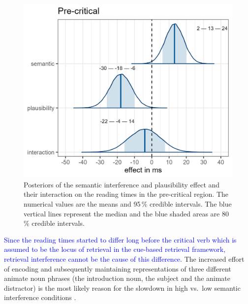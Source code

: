 \documentclass[review,preprint,12pt,authoryear,floatsintext]{elsarticle}
\begin{document}
\begin{figure}[ht]
    \centering
        \caption{Posteriors of the semantic interference and plausibility effect and their interaction on the reading times in the pre-critical region. The numerical values are the means and 95\,\% credible intervals. The blue vertical lines represent the median and the blue shaded areas are 80\,\% credible intervals.}\label{fig:posteriors_plausibility}
    \includegraphics[width=0.8\linewidth]{posteriors_spr_pooled_774_plausibility.png}
\end{figure}

\textcolor{blue}{Since the reading times started to differ long before the critical verb which is assumed to be the locus of retrieval in the cue-based retrieval framework,  retrieval interference cannot be the cause of this difference.} \label{smith2} The increased effort of encoding and subsequently maintaining representations of three different animate noun phrases (the introduction noun, the subject and the animate distractor) is the most likely reason for the slowdown in high vs.\ low semantic interference conditions \citep[for similar findings, see e.g., ][]{lago_etal_2021, ness2019, ness2017, kush_etal_2015, gordon02}. 

\label{previous_encoding}
\end{document}
